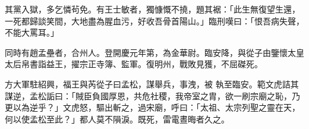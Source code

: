 \begin{pinyinscope}
 其黨入獄，多乞憐茍免。有王士敏者，獨慷慨不撓，題其裾：「此生無復望生還，一死都歸談笑間，大地盡為腥血污，好收吾骨首陽山。」臨刑嘆曰：「恨吾病失聲，不能大罵耳。」



 同時有趙孟壘者，合州人。登開慶元年第，為金華尉。臨安降，與從子由鑒懷太皇太后帛書詣益王，擢宗正寺簿、監軍。復明州，戰敗見獲，不屈磔死。



 方大軍駐紹興，福王與芮從子曰孟松，謀舉兵，事洩，被
 執至臨安。範文虎詰其謀逆，孟松詬曰：「賊臣負國厚恩，共危社稷，我帝室之胄，欲一刷宗廟之恥，乃更以為逆乎？」文虎怒，驅出斬之，過宋廟，呼曰：「太祖、太宗列聖之靈在天，何以使孟松至此？」都人莫不隕淚。既死，雷電晝晦者久之。



\end{pinyinscope}